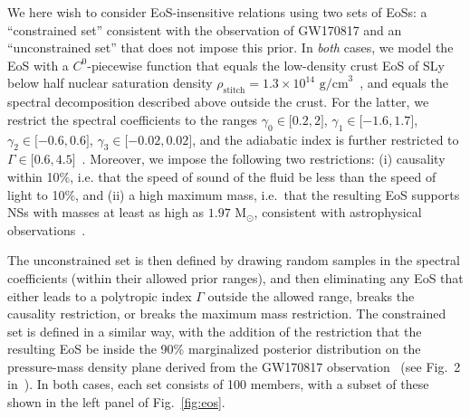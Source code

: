 \documentclass[prd,twocolumn,nofootinbib,superscriptaddress,amsmath,amssymb]{revtex4-1}
\begin{document}
We here wish to consider EoS-insensitive relations using two sets of EoSs: a ``constrained set'' consistent with the observation of GW170817 and an ``unconstrained set'' that does not impose this prior. In \emph{both} cases, we model the EoS with a $C^{0}$-piecewise function that equals the low-density crust EoS of SLy~\cite{Douchin:2001sv} below half nuclear saturation density $\rho_{\text{stitch}}=1.3 \times 10^{14} \text{ g/cm}^3$~\cite{Read2009}, and equals the spectral decomposition described above outside the crust. For the latter, we restrict the spectral coefficients to the ranges $\gamma_0 \in \lbrack 0.2,2 \rbrack$, $\gamma_1 \in \lbrack -1.6,1.7 \rbrack$, $\gamma_2 \in \lbrack -0.6,0.6 \rbrack$, $\gamma_3 \in \lbrack -0.02,0.02 \rbrack$, and the adiabatic index is further restricted to $\Gamma \in \lbrack 0.6,4.5 \rbrack$~\cite{Lindblom:parameters}. Moreover, we impose the following two restrictions:  (i) causality within 10\%, i.e. that the speed of sound of the fluid be less than the speed of light to 10\%, and (ii) a high maximum mass, i.e.~that the resulting EoS supports NSs with masses at least as high as $1.97 \text{ M}_{\odot}$, consistent with astrophysical observations~\cite{Zhao:massiveNS}. 

The unconstrained set is then defined by drawing random samples in the spectral coefficients (within their allowed prior ranges), and then eliminating any EoS that either leads to a polytropic index $\Gamma$ outside the allowed range, breaks the causality restriction, or breaks the maximum mass restriction. The constrained set is defined in a similar way, with the addition of the restriction that the resulting EoS be inside the 90\% marginalized posterior distribution on the pressure-mass density plane derived from the GW170817 observation~\cite{LIGO:posterior,Carney:2018sdv}  (see Fig.~2 in~\cite{LIGO:posterior}). In both cases, each set consists of 100 members, with a subset of these shown in the left panel of Fig.~\ref{fig:eos}.
\end{document}
